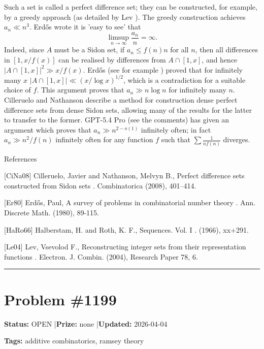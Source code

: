 \documentclass{article}
\begin{document}
Such a set is called a perfect difference set; they can be constructed, for example, by a greedy approach (as detailed by Lev \cite{Le04}). The greedy construction achieves $a_n\ll n^3$. Erd\H{o}s \cite{Er80} wrote it is 'easy to see' that\[\limsup_{n\to \infty}\frac{a_n}{n}=\infty.\]Indeed, since $A$ must be a Sidon set, if $a_n \leq f(n)n$ for all $n$, then all differences in $[1,x/f(x)]$ can be realised by differences from $A\cap [1,x]$, and hence $\lvert A\cap [1,x]\rvert^2 \gg x/f(x)$. Erd\H{o}s (see for example \cite{HaRo66}) proved that for infinitely many $x$ $\lvert A\cap [1,x]\rvert \ll (x/\log x)^{1/2}$, which is a contradiction for a suitable choice of $f$. This argument proves that $a_n\gg n\log n$ for infinitely many $n$. Cilleruelo and Nathanson \cite{CiNa08} describe a method for construction dense perfect difference sets from dense Sidon sets, allowing many of the results for the latter to transfer to the former. GPT-5.4 Pro (see the comments) has given an argument which proves that $a_n\gg n^{2-o(1)}$ infinitely often; in fact $a_n \gg n^2/f(n)$ infinitely often for any function $f$ such that $\sum \frac{1}{nf(n)}$ diverges.




References

[CiNa08] Cilleruelo, Javier and Nathanson, Melvyn B., Perfect difference sets constructed from Sidon sets . Combinatorica (2008), 401--414.

[Er80] Erd\H{o}s, Paul, A survey of problems in combinatorial number theory . Ann. Discrete Math. (1980), 89-115.

[HaRo66] Halberstam, H. and Roth, K. F., Sequences. {V}ol. I . (1966), xx+291.

[Le04] Lev, Vsevolod F., Reconstructing integer sets from their representation functions . Electron. J. Combin. (2004), Research Paper 78, 6.

\noindent\rule{\linewidth}{0.4pt}


\section{Problem \#1199}
\label{prob:1199}

\noindent\textbf{Status:} OPEN \quad|\quad \textbf{Prize:} none \quad|\quad \textbf{Updated:} 2026-04-04

\noindent\textbf{Tags:} additive combinatorics, ramsey theory

\medskip
\end{document}
